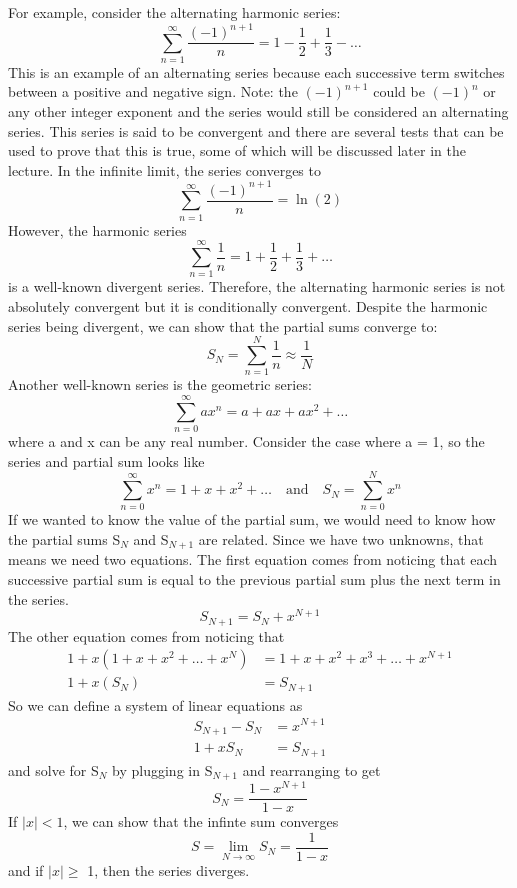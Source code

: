 \documentclass{article}
\newcommand{\be}{\begin{equation}}
\newcommand{\ee}{\end{equation}}
\begin{document}
For example, consider the alternating harmonic series:
\be
\sum_{n = 1}^{\infty} \frac{(-1)^{n+1}}{n} = 1 - \frac{1}{2} + \frac{1}{3} - \hdots
\ee
This is an example of an alternating series because each successive term switches between a positive and negative sign.
Note: the $(-1)^{n+1}$ could be $(-1)^{n}$ or any other integer exponent and the series would still be considered an alternating series.
This series is said to be convergent and there are several tests that can be used to prove that this is true, some of which will be discussed later in the lecture.
In the infinite limit, the series converges to
\be
\sum_{n = 1}^{\infty} \frac{(-1)^{n+1}}{n} = \ln(2)
\ee
However, the harmonic series
\be
\sum_{n = 1}^{\infty} \frac{1}{n} = 1 + \frac{1}{2} + \frac{1}{3} + \hdots
\ee
is a well-known divergent series.
Therefore, the alternating harmonic series is not absolutely convergent but it is conditionally convergent.
Despite the harmonic series being divergent, we can show that the partial sums converge to:
\be
S_N = \sum_{n=1}^{N} \frac{1}{n} \approx \frac{1}{N}
\ee
Another well-known series is the geometric series:
\be
\sum_{n=0}^{\infty} a x^n = a + ax + ax^2 + \hdots
\ee
where a and x can be any real number.
Consider the case where a = 1, so the series and partial sum looks like
\be
\sum_{n=0}^{\infty} x^n = 1 + x + x^2 + \hdots \quad \text{and} \quad S_N = \sum_{n=0}^{N} x^n
\ee
If we wanted to know the value of the partial sum, we would need to know how the partial sums S$_N$ and S$_{N+1}$ are related.
Since we have two unknowns, that means we need two equations.
The first equation comes from noticing that each successive partial sum is equal to the previous partial sum plus the next term in the series.
\be
S_{N+1} = S_N + x^{N+1}
\ee
The other equation comes from noticing that
\be
\begin{split}
1 + x(1 + x + x^2 + \hdots + x^N) &= 1 + x + x^2 + x^3 + \hdots + x^{N+1} \\
1 + x (S_N) &= S_{N+1}
\end{split}
\ee
So we can define a system of linear equations as
\be
\begin{split}
S_{N+1} - S_N &= x^{N+1} \\
1 + xS_N &= S_{N+1}
\end{split}
\ee
and solve for S$_N$ by plugging in S$_{N+1}$ and rearranging to get
\be
S_N = \frac{1-x^{N+1}}{1-x}
\ee
If $|x| < 1$, we can show that the infinte sum converges
\be
S = \lim_{N \to \infty}S_N = \frac{1}{1-x}
\ee
and if $|x|\geq$ 1, then the series diverges.
\end{document}
